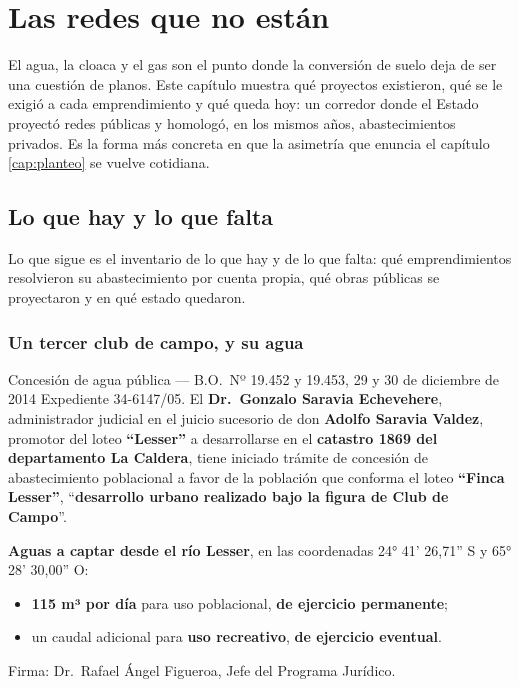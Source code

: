 \chapter{Las redes que no están}

\label{cap:redes}
El agua, la cloaca y el gas son el punto donde la conversión de suelo deja de ser una
cuestión de planos. Este capítulo muestra qué proyectos existieron, qué se le exigió a cada
emprendimiento y qué queda hoy: un corredor donde el Estado proyectó redes públicas y
homologó, en los mismos años, abastecimientos privados. Es la forma más concreta en que la
asimetría que enuncia el capítulo \ref{cap:planteo} se vuelve cotidiana.

\section{Lo que hay y lo que falta}

Lo que sigue es el inventario de lo que hay y de lo que falta: qué emprendimientos resolvieron su abastecimiento por cuenta propia, qué obras públicas se proyectaron y en qué estado quedaron.

\subsection*{Un tercer club de campo, y su agua}

\begin{ficha}{Concesión de agua pública --- B.O.\ Nº 19.452 y 19.453, 29 y 30 de diciembre de 2014}
Expediente 34-6147/05. El \textbf{Dr.\ Gonzalo Saravia Echevehere}, administrador judicial en el juicio sucesorio de don \textbf{Adolfo Saravia Valdez}, promotor del loteo \textbf{``Lesser''} a desarrollarse en el \textbf{catastro 1869 del departamento La Caldera}, tiene iniciado trámite de concesión de abastecimiento poblacional a favor de la población que conforma el loteo \textbf{``Finca Lesser''}, ``\textbf{desarrollo urbano realizado bajo la figura de Club de Campo}''.

\textbf{Aguas a captar desde el río Lesser}, en las coordenadas 24° 41' 26,71'' S y 65° 28' 30,00'' O:
\begin{itemize}[leftmargin=*,nosep]
\item \textbf{115 m³ por día} para uso poblacional, \textbf{de ejercicio permanente};
\item un caudal adicional para \textbf{uso recreativo}, \textbf{de ejercicio eventual}.
\end{itemize}

Firma: Dr.\ Rafael Ángel Figueroa, Jefe del Programa Jurídico.
\end{ficha}

